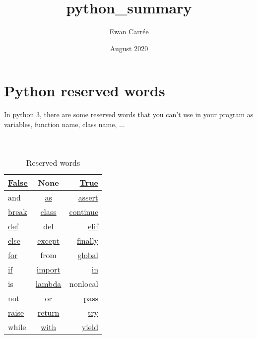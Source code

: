 \documentclass[a4paper, 12pt]{article}
\title{\textbf{python\_summary}}
\author{Ewan Carrée}
\date{August 2020}
\begin{document}
\maketitle
\newpage

\tableofcontents

\newpage
\section{Python reserved words}
In python 3, there are some reserved words that you can't use in your program as variables, function name, class name, ... \\ \\ \\

\begin{table}[h]
\begin{center}
{\renewcommand{\arraystretch}{2} %
{\setlength{\tabcolsep}{1.5cm} %
\begin{tabular}{|l|c|r|}
  \hline
  \hyperref[subsec:Bool]{False} & None & \hyperref[subsec:Bool]{True} \\
  \hline
  and & \hyperref[As]{as} & \hyperref[subsec:Assertion]{assert} \\
  \hline
  \hyperref[subsec:BCPR]{break} & \hyperref[sec:Class]{class} & \hyperref[subsec:BCPR]{continue} \\
  \hline
  \hyperref[sec:Function]{def} & del & \hyperref[IEE]{elif} \\
  \hline
  \hyperref[IEE]{else} & \hyperref[TEEF]{except} & \hyperref[TEEF]{finally} \\
  \hline
  \hyperref[subsec:For]{for} & from & \hyperref[subsec:Global]{global} \\
  \hline
  \hyperref[IEE]{if} & \hyperref[subsec:Import]{import} & \hyperref[subsec:ListComprehension]{in} \\
  \hline
  is & \hyperref[subsec:Lambda]{lambda} & nonlocal \\
  \hline 
  not & or & \hyperref[subsec:BCPR]{pass} \\
  \hline 
  \hyperref[Raise]{raise} & \hyperref[subsec:BCPR]{return} & \hyperref[TEEF]{try} \\
  \hline
  while & \hyperref[subsec:ContextManager]{with} & \hyperref[sec:Generators]{yield} \\
  \hline
\end{tabular}}}
\end{center}
\caption{Reserved words}
\end{table}
\end{document}
